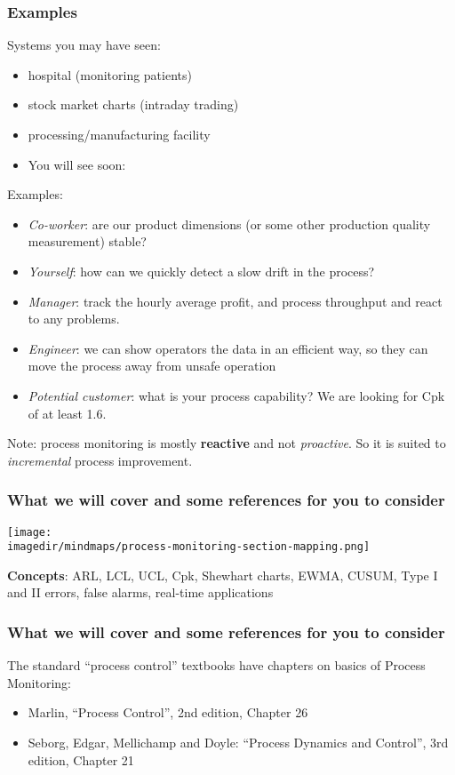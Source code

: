 \begin{frame}\frametitle{Examples}

	Systems you may have seen:
	\begin{itemize}
		\item	hospital (monitoring patients)
		\item	stock market charts (intraday trading)
		\item	processing/manufacturing facility
		\item	You will see soon: {\color{myRed}{The ExCEL building}}
	\end{itemize}
	
	\vspace{4pt}
	Examples:
	\begin{itemize}
		\item	\emph{Co-worker}: are our product dimensions (or some other production quality measurement) stable?
		\item	\emph{Yourself}: how can we quickly detect a slow drift in the process?
		\item	\emph{Manager}: track the hourly average profit, and process throughput and react to any problems.
		\item	\emph{Engineer}: we can show operators the data in an efficient way, so they can move the process away from unsafe operation
		\item	\emph{Potential customer}: what is your process capability? We are looking for Cpk of at least 1.6.
	\end{itemize}

	Note: process monitoring is mostly \textbf{reactive} and not \emph{proactive}. So it is suited to \emph{incremental} process improvement.
\end{frame}

\begin{frame}\frametitle{What we will cover and some references for you to consider}

	\texttt{[image: \\imagedir/mindmaps/process-monitoring-section-mapping.png]}

	\textbf{Concepts}: ARL, LCL, UCL, Cpk, Shewhart charts, EWMA, CUSUM, Type I and II errors, false alarms, real-time applications
\end{frame}

\begin{frame}\frametitle{What we will cover and some references for you to consider}
	\vspace{12pt}
	The standard ``process control'' textbooks have chapters on basics of Process Monitoring:
	\begin{itemize}
		\item	Marlin, ``Process Control'', 2nd edition, Chapter 26
		\item	Seborg, Edgar, Mellichamp and Doyle: ``Process Dynamics and Control'', 3rd edition, Chapter 21
	\end{itemize}
\end{frame}

